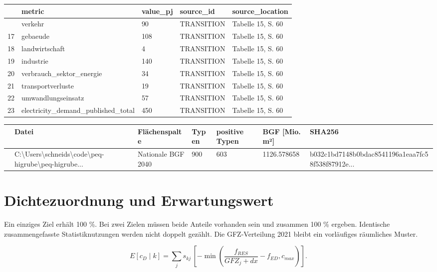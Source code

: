 \documentclass[
  ngerman,
  a4paper,
  DIV=11]{scrreprt}
\newcounter{none} %
\begin{document}
{\def\LTcaptype{none} %
\begin{longtable}[]{@{}lllll@{}}
\toprule\noalign{}
& metric & value\_pj & source\_id & source\_location \\
\midrule\noalign{}
\endhead
\bottomrule\noalign{}
\endlastfoot
16 & verkehr & 90 & TRANSITION & Tabelle 15, S. 60 \\
17 & gebaeude & 108 & TRANSITION & Tabelle 15, S. 60 \\
18 & landwirtschaft & 4 & TRANSITION & Tabelle 15, S. 60 \\
19 & industrie & 140 & TRANSITION & Tabelle 15, S. 60 \\
20 & verbrauch\_sektor\_energie & 34 & TRANSITION & Tabelle 15, S. 60 \\
21 & transportverluste & 19 & TRANSITION & Tabelle 15, S. 60 \\
22 & umwandlungseinsatz & 57 & TRANSITION & Tabelle 15, S. 60 \\
23 & electricity\_demand\_published\_total & 450 & TRANSITION & Tabelle
15, S. 60 \\
\end{longtable}
}

{\def\LTcaptype{none} %
\begin{longtable}[]{@{}lllllll@{}}
\toprule\noalign{}
& Datei & Flächenspalte & Typen & positive Typen & BGF {[}Mio. m²{]} &
SHA256 \\
\midrule\noalign{}
\endhead
\bottomrule\noalign{}
\endlastfoot
0 &
C:\textbackslash Users\textbackslash schneids\textbackslash code\textbackslash peq-higrube\textbackslash peq-higrube...
& Nationale BGF 2040 & 900 & 603 & 1126.578658 &
b032c1bd7148b0bdac8541196a1eaa7fc58f538f87912e... \\
\end{longtable}
}

\section{Dichtezuordnung und
Erwartungswert}\label{dichtezuordnung-und-erwartungswert}

Ein einziges Ziel erhält 100 \%. Bei zwei Zielen müssen beide Anteile
vorhanden sein und zusammen 100 \% ergeben. Identische zusammengefasste
Statistiknutzungen werden nicht doppelt gezählt. Die GFZ-Verteilung 2021
bleibt ein vorläufiges räumliches Muster.

\[E[c_D\mid k]=\sum_j s_{kj}\,\left[-\min\left(\frac{f_{RES}}{GFZ_j+dx}-f_{ED},c_{max}\right)\right].\]
\end{document}
